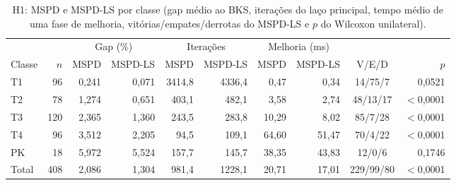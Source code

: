\begin{table}[t]
\centering
\caption{H1: MSPD e MSPD-LS por classe (gap médio ao BKS, iterações do laço principal, tempo médio de uma fase de melhoria, vitórias/empates/derrotas do MSPD-LS e $p$ do Wilcoxon unilateral).}
\label{tab:h1}
\footnotesize
\setlength{\tabcolsep}{4pt}
\begin{tabular}{lrrrrrrrcr}
\toprule
 & & \multicolumn{2}{c}{Gap (\%)} & \multicolumn{2}{c}{Iterações} & \multicolumn{2}{c}{Melhoria (ms)} & & \\
\cmidrule(lr){3-4}\cmidrule(lr){5-6}\cmidrule(lr){7-8}
Classe & $n$ & MSPD & MSPD-LS & MSPD & MSPD-LS & MSPD & MSPD-LS & V/E/D & $p$ \\
\midrule
T1 & 96 & 0,241 & 0,071 & 3414,8 & 4336,4 & 0,47 & 0,34 & 14/75/7 & 0,0521 \\
T2 & 78 & 1,274 & 0,651 & 403,1 & 482,1 & 3,58 & 2,74 & 48/13/17 & $<$0,0001 \\
T3 & 120 & 2,365 & 1,360 & 243,5 & 283,8 & 10,29 & 8,02 & 85/7/28 & $<$0,0001 \\
T4 & 96 & 3,512 & 2,205 & 94,5 & 109,1 & 64,60 & 51,47 & 70/4/22 & $<$0,0001 \\
PK & 18 & 5,972 & 5,524 & 157,7 & 145,7 & 38,35 & 43,83 & 12/0/6 & 0,1746 \\
\midrule
Total & 408 & 2,086 & 1,304 & 981,4 & 1228,1 & 20,71 & 17,01 & 229/99/80 & $<$0,0001 \\
\bottomrule
\end{tabular}
\end{table}
